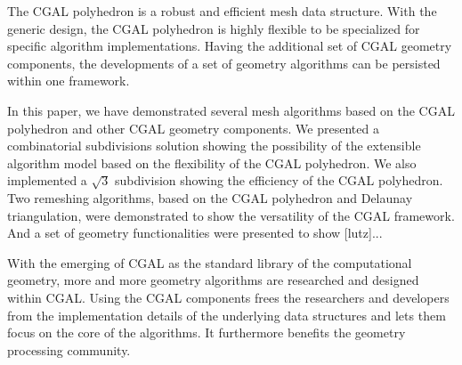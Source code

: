 The CGAL polyhedron is a robust and efficient mesh data structure.
With the generic design, the CGAL polyhedron is highly flexible
to be specialized for specific algorithm implementations.
Having the additional set of CGAL geometry components, the 
developments of a set of geometry algorithms can be
persisted within one framework.

In this paper, we have demonstrated several 
mesh algorithms based on the
CGAL polyhedron and other CGAL geometry components. We 
presented a combinatorial subdivisions solution showing the 
possibility of the extensible algorithm model 
based on the flexibility of the CGAL polyhedron. We also 
implemented a $\sqrt{3}$ subdivision showing the 
efficiency of the CGAL polyhedron.
Two remeshing algorithms, based on the CGAL polyhedron
and Delaunay triangulation, were demonstrated to show 
the versatility of the CGAL framework. And a set of
geometry functionalities were presented to show [lutz]...

With the emerging of CGAL as the standard library of the 
computational geometry, more and more geometry algorithms 
are researched and designed within CGAL. Using the CGAL
components frees the researchers and developers from the
implementation details of the underlying data structures
and lets them focus on the core of the algorithms. It
furthermore benefits the geometry processing community.
